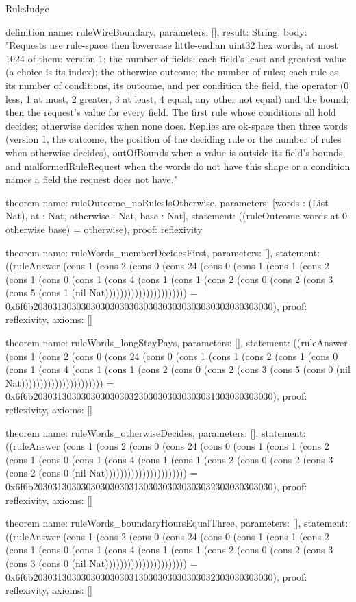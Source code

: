 \begin{lexlean}{RuleJudge}
\begin{semanticmodule}
definition{
  name: ruleWireBoundary,
  parameters: [],
  result: String,
  body: "Requests use rule-space then lowercase little-endian uint32 hex words, at most 1024 of them: version 1; the number of fields; each field's least and greatest value (a choice is its index); the otherwise outcome; the number of rules; each rule as its number of conditions, its outcome, and per condition the field, the operator (0 less, 1 at most, 2 greater, 3 at least, 4 equal, any other not equal) and the bound; then the request's value for every field. The first rule whose conditions all hold decides; otherwise decides when none does. Replies are ok-space then three words (version 1, the outcome, the position of the deciding rule or the number of rules when otherwise decides), outOfBounds when a value is outside its field's bounds, and malformedRuleRequest when the words do not have this shape or a condition names a field the request does not have."
}

theorem{
  name: ruleOutcome_noRulesIsOtherwise,
  parameters: [words : (List Nat), at : Nat, otherwise : Nat, base : Nat],
  statement: ((ruleOutcome words at 0 otherwise base) = otherwise),
  proof: reflexivity{}
}

theorem{
  name: ruleWords_memberDecidesFirst,
  parameters: [],
  statement: ((ruleAnswer (cons 1 (cons 2 (cons 0 (cons 24 (cons 0 (cons 1 (cons 1 (cons 2 (cons 1 (cons 0 (cons 1 (cons 4 (cons 1 (cons 1 (cons 2 (cons 0 (cons 2 (cons 3 (cons 5 (cons 1 (nil Nat)))))))))))))))))))))) = 0x6f6b20303130303030303030303030303030303030303030303030),
  proof: reflexivity{},
  axioms: []
}

theorem{
  name: ruleWords_longStayPays,
  parameters: [],
  statement: ((ruleAnswer (cons 1 (cons 2 (cons 0 (cons 24 (cons 0 (cons 1 (cons 1 (cons 2 (cons 1 (cons 0 (cons 1 (cons 4 (cons 1 (cons 1 (cons 2 (cons 0 (cons 2 (cons 3 (cons 5 (cons 0 (nil Nat)))))))))))))))))))))) = 0x6f6b20303130303030303030323030303030303031303030303030),
  proof: reflexivity{},
  axioms: []
}

theorem{
  name: ruleWords_otherwiseDecides,
  parameters: [],
  statement: ((ruleAnswer (cons 1 (cons 2 (cons 0 (cons 24 (cons 0 (cons 1 (cons 1 (cons 2 (cons 1 (cons 0 (cons 1 (cons 4 (cons 1 (cons 1 (cons 2 (cons 0 (cons 2 (cons 3 (cons 2 (cons 0 (nil Nat)))))))))))))))))))))) = 0x6f6b20303130303030303030313030303030303032303030303030),
  proof: reflexivity{},
  axioms: []
}

theorem{
  name: ruleWords_boundaryHoursEqualThree,
  parameters: [],
  statement: ((ruleAnswer (cons 1 (cons 2 (cons 0 (cons 24 (cons 0 (cons 1 (cons 1 (cons 2 (cons 1 (cons 0 (cons 1 (cons 4 (cons 1 (cons 1 (cons 2 (cons 0 (cons 2 (cons 3 (cons 3 (cons 0 (nil Nat)))))))))))))))))))))) = 0x6f6b20303130303030303030313030303030303032303030303030),
  proof: reflexivity{},
  axioms: []
}


\end{semanticmodule}
\end{lexlean}
